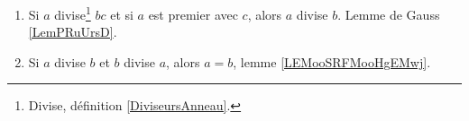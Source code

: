 \begin{enumerate}
	\item
	      Si \( a\) divise\footnote{Divise, définition \ref{DiviseursAnneau}.} \( bc\) et si \( a\) est premier avec \( c\), alors \( a\) divise \( b\). Lemme de Gauss \ref{LemPRuUrsD}.
	\item
	      Si \( a\) divise \( b\) et \( b\) divise \( a\), alors \( a=b\), lemme \ref{LEMooSRFMooHgEMwj}.
\end{enumerate}
